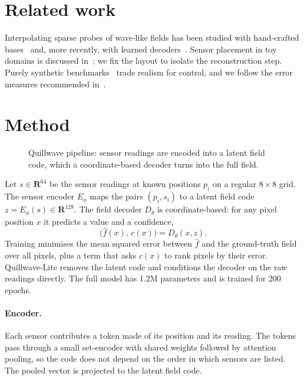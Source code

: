 \documentclass[11pt,a4paper]{article}
\begin{document}
\section{Related work}
Interpolating sparse probes of wave-like fields has been studied with hand-crafted
bases~\cite{nobody2024interpolating,anyone2023radial} and, more recently, with learned
decoders~\cite{someone2025learned}. Sensor placement in toy domains is discussed
in~\cite{whoever2024placement}; we fix the layout to isolate the reconstruction step. Purely synthetic
benchmarks~\cite{nameless2025benchmarks} trade realism for control, and we follow the error measures
recommended in~\cite{anybody2025measuring}.

\section{Method}
\begin{figure}[t]\centering
\resizebox{\linewidth}{!}{}
\caption{Quillwave pipeline: sensor readings are encoded into a latent field code, which a coordinate-based
decoder turns into the full field.}\label{fig:overview}
\end{figure}

Let $s\in\mathbf{R}^{64}$ be the sensor readings at known positions $p_i$ on a regular
$8\times8$ grid. The sensor encoder $E_\phi$ maps the pairs $(p_i, s_i)$ to a latent field code
$z = E_\phi(s) \in \mathbf{R}^{128}$. The field decoder $D_\theta$ is coordinate-based: for any pixel
position $x$ it predicts a value and a confidence,
\begin{equation}
  \bigl(\hat f(x),\, c(x)\bigr) = D_\theta(x, z).
\end{equation}
Training minimises the mean squared error between $\hat f$ and the ground-truth field over all pixels,
plus a term that asks $c(x)$ to rank pixels by their error. Quillwave-Lite removes the latent code and
conditions the decoder on the raw readings directly. The full model has 1.2M parameters and is trained
for 200 epochs.
\paragraph{Encoder.} Each sensor contributes a token made of its position and its reading. The tokens
pass through a small set-encoder with shared weights followed by attention pooling, so the code does not
depend on the order in which sensors are listed. The pooled vector is projected to the latent field code.
\end{document}
